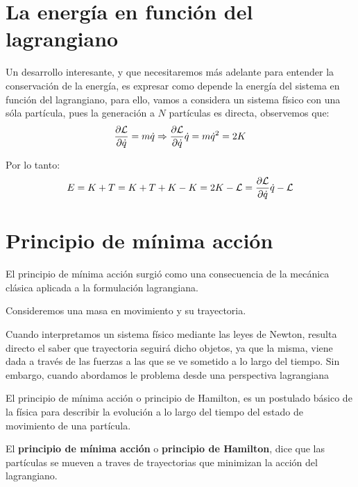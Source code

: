 \section{La energía en función del lagrangiano}\label{sec:la-energia-en-funcion-del-lagrangiano}

Un desarrollo interesante, y que necesitaremos más adelante para entender la conservación de la energía, es expresar como depende la energía del sistema en función del lagrangiano, para ello, vamos a considera un sistema físico con una sóla partícula, pues la generación a $N$ partículas es directa, observemos que:
\begin{equation*}
	\frac{\partial\mathcal{L}}{\partial\dot{q}} =m\dot{q}\Rightarrow \frac{\partial\mathcal{L}}{\partial\dot{q}}\dot{q} =m\dot{q}^2 = 2K
\end{equation*}

Por lo tanto:
\begin{equation}
	\label{eq:energia-lagrangiana}
	E=K+T=K+T+K-K=2K-\mathcal{L}=\frac{\partial\mathcal{L}}{\partial\dot{q}}\dot{q}-\mathcal{L}
\end{equation}

\section{Principio de mínima acción}\label{sec:principio-de-minima-accion}

El principio de mínima acción surgió como una consecuencia de la mecánica clásica aplicada a la formulación lagrangiana.

Consideremos una masa en movimiento y su trayectoria.

Cuando interpretamos un sistema físico mediante las leyes de Newton, resulta directo el saber que trayectoria seguirá dicho objetos, ya que la misma, viene dada a través de las fuerzas a las que se ve sometido a lo largo del tiempo. Sin embargo, cuando abordamos le problema desde una perspectiva lagrangiana

El principio de mínima acción o principio de Hamilton, es un postulado básico de la física para describir la evolución a lo largo del tiempo del estado de movimiento de una partícula.

El \textbf{principio de mínima acción} o \textbf{principio de Hamilton}, dice que las partículas se mueven a traves de trayectorias que minimizan la acción del lagrangiano.
